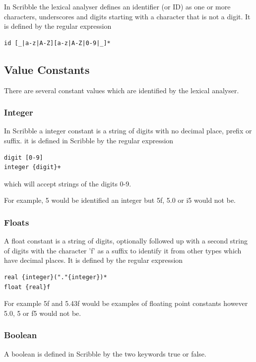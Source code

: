 \documentclass[]{final_report}
\begin{document}
In Scribble the lexical analyser defines an identifier (or ID) as one or more characters, underscores and digits starting with a character that is not a digit. It is defined by the regular expression
\begin{verbatim}
id [_|a-z|A-Z][a-z|A-Z|0-9|_]*
\end{verbatim}

\subsection{Value Constants}

There are several constant values which are identified by the lexical analyser.

\subsubsection{Integer}

In Scribble a integer constant is a string of digits with no decimal place, prefix or suffix. it is defined in Scribble by the regular expression 

\begin{verbatim}
digit [0-9]
integer {digit}+
\end{verbatim}

which will accept strings of the digits 0-9.

For example, 5 would be identified an integer but 5f, 5.0 or i5 would not be.

\subsubsection{Floats}

A float constant is a string of digits, optionally followed up with a second string of digits with the character 'f' as a suffix to identify it from other types which have decimal places. It is defined by the regular expression
\begin{verbatim}
real {integer}("."{integer})*
float {real}f
\end{verbatim}

For example 5f and 5.43f would be examples of floating point constants however 5.0, 5 or f5 would not be.

\subsubsection{Boolean}

A boolean is defined in Scribble by the two keywords true or false.
\end{document}
